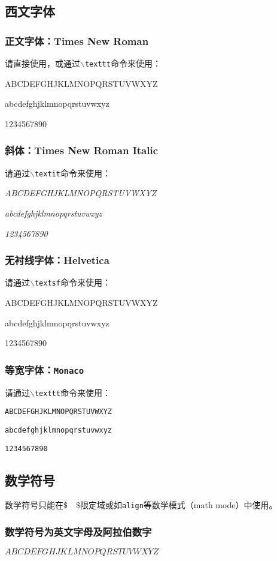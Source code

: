 \subsection{西文字体}

\subsubsection{正文字体：Times New Roman}
请直接使用，或通过\texttt{$\backslash$texttt}命令来使用：

ABCDEFGHJKLMNOPQRSTUVWXYZ 

abcdefghjklmnopqrstuvwxyz 

1234567890

\subsubsection{斜体：Times New Roman Italic}
请通过\texttt{$\backslash$textit}命令来使用：

\textit{ABCDEFGHJKLMNOPQRSTUVWXYZ}

\textit{abcdefghjklmnopqrstuvwxyz}

\textit{1234567890}

\subsubsection{无衬线字体：\textsf{Helvetica}}
请通过\texttt{$\backslash$textsf}命令来使用：

\textsf{ABCDEFGHJKLMNOPQRSTUVWXYZ}

\textsf{abcdefghjklmnopqrstuvwxyz}

\textsf{1234567890}

\subsubsection{等宽字体：\texttt{Monaco}}
请通过\texttt{$\backslash$texttt}命令来使用：

\texttt{ABCDEFGHJKLMNOPQRSTUVWXYZ}

\texttt{abcdefghjklmnopqrstuvwxyz}

\texttt{1234567890}

\subsection{数学符号}
数学符号只能在$\$\quad\$$限定域或如\texttt{align}等数学模式（math mode）中使用。

\subsubsection{数学符号为英文字母及阿拉伯数字}
$ABCDEFGHJKLMNOPQRSTUVWXYZ$

